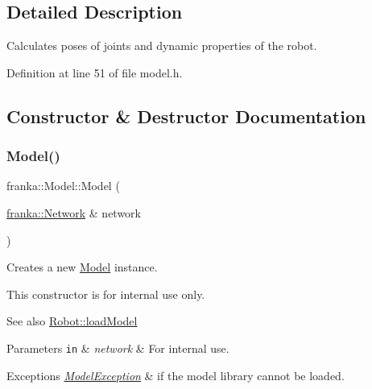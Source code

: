 \subsection{Detailed Description}
Calculates poses of joints and dynamic properties of the robot. 

Definition at line 51 of file model.\+h.



\subsection{Constructor \& Destructor Documentation}
\mbox{\label{classfranka_1_1Model_a751d939935eb51f06dcfd18c6c756ceb}} 
\subsubsection{\texorpdfstring{Model()}{Model()}\hspace{0.1cm}{\footnotesize\ttfamily [1/2]}}
{\footnotesize\ttfamily franka\+::\+Model\+::\+Model (\begin{DoxyParamCaption}\item[{\hyperlink{classfranka_1_1Network}{franka\+::\+Network} \&}]{network }\end{DoxyParamCaption})\hspace{0.3cm}{\ttfamily [explicit]}}

Creates a new \hyperlink{classfranka_1_1Model}{Model} instance.

This constructor is for internal use only.

\begin{DoxySeeAlso}{See also}
\hyperlink{classfranka_1_1Robot_a2da598c539469827409ac7e3bb61d5da}{Robot\+::load\+Model}
\end{DoxySeeAlso}

\begin{DoxyParams}[1]{Parameters}
\mbox{\tt in}  & {\em network} & For internal use.\\
\hline
\end{DoxyParams}

\begin{DoxyExceptions}{Exceptions}
{\em \hyperlink{structfranka_1_1ModelException}{Model\+Exception}} & if the model library cannot be loaded. \\
\hline
\end{DoxyExceptions}


